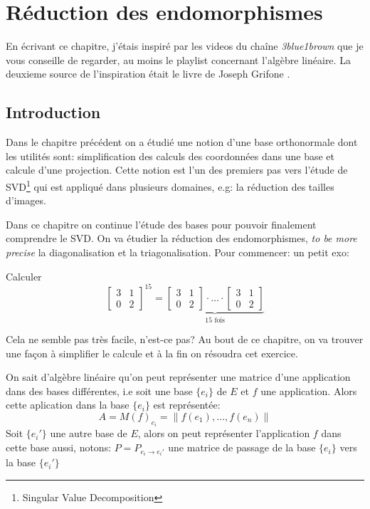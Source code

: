 \chapter{Réduction des endomorphismes}
En écrivant ce chapitre, j'étais inspiré par les videos du chaîne \textit{3blue1brown} que je vous conseille de regarder, au moins le playlist concernant l'algèbre linéaire. La deuxieme source de l'inspiration était le livre de Joseph Grifone \cite{grifone}.
\section{Introduction}
Dans le chapitre précédent on a étudié une notion d'une base orthonormale dont les utilités sont: simplification des calculs des coordonnées dans une base et calcule d'une projection. 
Cette notion est l'un des premiers pas vers l'étude de SVD\footnote{Singular Value Decomposition} qui est appliqué dans plusieurs domaines, e.g: la réduction des tailles d'images.
\par
Dans ce chapitre on continue l'étude des bases pour pouvoir finalement comprendre le SVD. On va étudier la réduction des endomorphismes, \textit{to be more precise} la diagonalisation et la triagonalisation. Pour commencer: un petit exo:
\begin{ex}
   Calculer 
   \[
   \begin{bmatrix} 
       3 & 1\\
       0 & 2
   \end{bmatrix}^{15} = \underbrace{
       \begin{bmatrix} 
       3 & 1\\
       0 & 2
       \end{bmatrix}
       \cdot
       \ldots
       \cdot
       \begin{bmatrix} 
       3 & 1\\
       0 & 2
       \end{bmatrix}
   }_{15 \text{ fois}}
   \] 
\end{ex}
Cela ne semble pas très facile, n'est-ce pas? Au bout de ce chapitre, on va trouver une façon à simplifier le calcule et à la fin on résoudra cet exercice.
\par
On sait d'algèbre linéaire qu'on peut représenter une matrice d'une application dans des bases différentes, i.e soit une base $\{e_i\}$ de $E$ et  $f$ une application. Alors cette aplication dans la base  $\{e_i\}$ est représentée:
 \[
A = M(f)_{e_i} = \|f(e_1), \ldots, f(e_n)\|
\] 
Soit $\{e_i'\}$ une autre base de  $E$, alors on peut représenter l'application  $f$ dans cette base aussi, notons:  $P = P_{e_i \to e_i'}$ une matrice de passage de la base $\{e_i\}$ vers la base  $\{e_i'\}$

